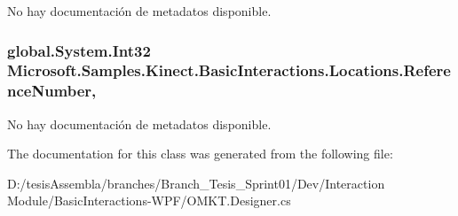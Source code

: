 No hay documentación de metadatos disponible. 

\hypertarget{class_microsoft_1_1_samples_1_1_kinect_1_1_basic_interactions_1_1_locations_a774db2e6845741c8dfa16fd2ad794f68}{
\subsubsection[{Reference\-Number}]{\setlength{\rightskip}{0pt plus 5cm}global.\-System.\-Int32 Microsoft.\-Samples.\-Kinect.\-Basic\-Interactions.\-Locations.\-Reference\-Number\hspace{0.3cm}{\ttfamily [get]}, {\ttfamily [set]}}}\label{class_microsoft_1_1_samples_1_1_kinect_1_1_basic_interactions_1_1_locations_a774db2e6845741c8dfa16fd2ad794f68}


No hay documentación de metadatos disponible. 



The documentation for this class was generated from the following file\-:\begin{DoxyCompactItemize}
\item 
D\-:/tesis\-Assembla/branches/\-Branch\-\_\-\-Tesis\-\_\-\-Sprint01/\-Dev/\-Interaction Module/\-Basic\-Interactions-\/\-W\-P\-F/O\-M\-K\-T.\-Designer.\-cs\end{DoxyCompactItemize}
